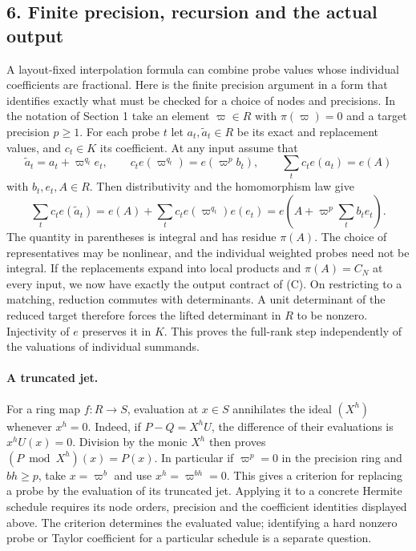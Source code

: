 \documentclass[
  11pt,
]{article}
\begin{document}
\subsection{6. Finite precision, recursion and the actual
output}\label{finite-precision-recursion-and-the-actual-output}

A layout-fixed interpolation formula can combine probe values whose
individual coefficients are fractional. Here is the finite precision
argument in a form that identifies exactly what must be checked for a
choice of nodes and precisions. In the notation of Section 1 take an
element \(\varpi\in R\) with \(\pi(\varpi)=0\) and a target precision
\(p\ge1\). For each probe \(t\) let \(a_t,\widetilde a_t\in R\)
be its exact and replacement values, and \(c_t\in K\) its coefficient.
At any input assume that
\[
 \widetilde a_t=a_t+\varpi^{q_t}e_t,\qquad
 c_t e(\varpi^{q_t})=e(\varpi^p b_t),\qquad
 \sum_t c_t e(a_t)=e(A)
\]
with \(b_t,e_t,A\in R\). Then distributivity and the homomorphism law give
\[
 \sum_t c_t e(\widetilde a_t)
   =e(A)+\sum_t c_t e(\varpi^{q_t})e(e_t)
   =e\!\left(A+\varpi^p\sum_t b_t e_t\right).
\]
The quantity in parentheses is integral and has residue \(\pi(A)\).
The choice of representatives may be nonlinear, and the individual
weighted probes need not be integral. If the replacements expand into
local products and \(\pi(A)=C_N\) at every input, we now have exactly
the output contract of (C). On restricting to a matching, reduction
commutes with determinants. A unit determinant of the reduced target
therefore forces the lifted determinant in \(R\) to be nonzero.
Injectivity of \(e\) preserves it in \(K\). This proves the full-rank
step independently of the valuations of individual summands.

\paragraph{A truncated jet.}
For a ring map \(f:R\to S\), evaluation at \(x\in S\) annihilates the
ideal \((X^h)\) whenever \(x^h=0\). Indeed, if
\(P-Q=X^h U\), the difference of their evaluations is \(x^hU(x)=0\).
Division by the monic \(X^h\) then proves
\((P\bmod X^h)(x)=P(x)\). In particular if \(\varpi^p=0\) in the
precision ring and \(bh\ge p\), take \(x=\varpi^b\) and use
\(x^h=\varpi^{bh}=0\). This gives a criterion for replacing a probe
by the evaluation of its truncated jet. Applying it to a concrete
Hermite schedule requires its node orders, precision and the coefficient
identities displayed above. The criterion determines the evaluated
value; identifying a hard nonzero probe or Taylor coefficient for a
particular schedule is a separate question.
\end{document}
